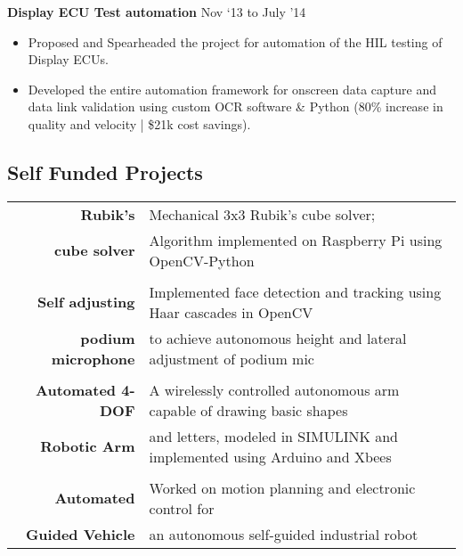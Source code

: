 \documentclass[a4paper,10pt]{article} %
\begin{document}

 \textbf{Display ECU Test automation} \hfill Nov ‘13 to July '14 
\begin{itemize} \itemsep -2pt %
\item Proposed and Spearheaded the project for automation of the HIL testing of Display ECUs. 
\item Developed the entire automation framework for onscreen data capture and data link validation using custom OCR software \& Python (80\% increase in quality and velocity | \$21k cost savings).
\end{itemize}



\subsection{Self Funded Projects}

\begin{tabular}{rl}	
\ \textbf{Rubik’s} & Mechanical 3x3 Rubik's cube solver; \\
\ \textbf{cube solver} & Algorithm implemented on Raspberry Pi using OpenCV-Python\\
&\\

\ \textbf{Self adjusting}  & Implemented face detection and tracking using Haar cascades in OpenCV \\
\ \textbf{podium microphone} & to achieve autonomous height and lateral adjustment of podium mic\\ & \\
\ \textbf{Automated 4-DOF} &  A wirelessly controlled autonomous arm capable of drawing basic shapes  \\
\ \textbf{Robotic Arm} &  and letters, modeled in SIMULINK and implemented using Arduino and Xbees\\ & \\
\ \textbf{Automated }& Worked on motion planning and electronic control for \\
\ \textbf{Guided Vehicle} & an autonomous self-guided industrial robot\\


\end{tabular}

\end{document}
